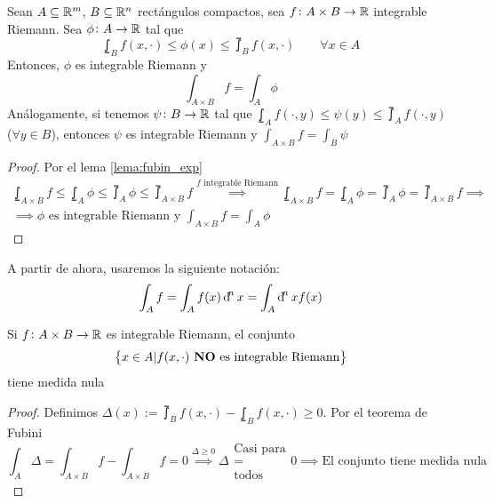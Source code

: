 \begin{teo}
    Sean $A \subseteq \mathbb{R}^m$, $B \subseteq \mathbb{R}^n$ rectángulos compactos, sea
    $f \colon A \times B \to \mathbb{R}$ integrable Riemann. Sea $\phi \colon A \to \mathbb{R}$
    tal que
    \[
        \lowint_B f(x, \cdot) \leq \phi(x) \leq \upint_B f(x, \cdot) \qquad
        \forall x \in A
    \]
    Entonces, $\phi$ es integrable Riemann y
    \[
        \int_{A \times B} f = \int_A \phi
    \]
    Análogamente, si tenemos $\psi \colon B \to \mathbb{R}$ tal que $\lowint_A f(\cdot, y)
    \leq \psi(y) \leq \upint_A f(\cdot, y)$ ($\forall y \in B$), entonces $\psi$ es
    integrable Riemann y $\int_{A \times B} f = \int_B \psi$
\end{teo}

\begin{proof}
    Por el lema \ref{lema:fubin_exp}
    \begin{gather*}
        \lowint_{A \times B} f \leq \lowint_A \phi \leq \upint_A \phi \leq
        \upint_{A \times B} f \stackrel{f \text{ integrable Riemann}}{\implies}
        \lowint_{A \times B} f = \lowint_A \phi = \upint_A \phi = \upint_{A \times B} f
        \implies \\ \implies \phi \text{ es integrable Riemann y } \int_{A \times B} f
        = \int_A \phi
    \end{gather*}
\end{proof}
\begin{obs}
    A partir de ahora, usaremos la siguiente notación:
    \[
        \int_A f = \int_A f(x) \dif^n x = \int_A \dif^n x f(x)
    \]
\end{obs}

\begin{obs}
    Si $f \colon A \times B \to \mathbb{R}$ es integrable Riemann, el conjunto
    \[
        \left\{x \in A \vert f(x, \cdot) \text{ \textbf{NO} es integrable Riemann}\right\}
    \]
    tiene medida nula
\end{obs}

\begin{proof}
    Definimos $\Delta(x) := \upint_B f(x, \cdot) - \lowint_B f(x, \cdot) \geq 0$. Por
    el teorema de Fubini
    \[
        \int_A \Delta = \int_{A \times B} f - \int_{A \times B} f = 0
        \stackrel{\Delta \geq 0}{\implies} \Delta \substack{\text{Casi para} \\ = \\
        \text{todos}} 0 \implies \text{El conjunto tiene medida nula}
    \]
\end{proof}

